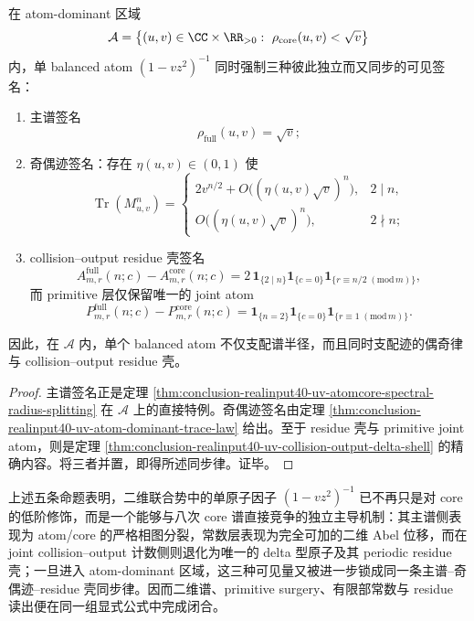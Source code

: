 \begin{theorem}\label{thm:conclusion-realinput40-uv-atom-dominant-three-signature-synchrony}
在 atom-dominant 区域
\[
\mathcal A
=
\bigl\{(u,v)\in\CC\times\RR_{>0}:\ \rho_{\mathrm{core}}(u,v)<\sqrt v\bigr\}
\]
内，单 balanced atom \((1-vz^2)^{-1}\) 同时强制三种彼此独立而又同步的可见签名：
\begin{enumerate}
  \item 主谱签名
  \[
  \rho_{\mathrm{full}}(u,v)=\sqrt v;
  \]
  \item 奇偶迹签名：存在 \(\eta(u,v)\in(0,1)\) 使
  \[
  \operatorname{Tr}(M_{u,v}^n)=
  \begin{cases}
  2v^{n/2}+O\!\bigl((\eta(u,v)\sqrt v)^n\bigr),& 2\mid n,\\[4pt]
  O\!\bigl((\eta(u,v)\sqrt v)^n\bigr),& 2\nmid n;
  \end{cases}
  \]
  \item collision--output residue 壳签名
  \[
  A_{m,r}^{\mathrm{full}}(n;c)-A_{m,r}^{\mathrm{core}}(n;c)
  =
  2\,\mathbf 1_{\{2\mid n\}}
  \mathbf 1_{\{c=0\}}
  \mathbf 1_{\{r\equiv n/2\;(\mathrm{mod}\,m)\}},
  \]
  而 primitive 层仅保留唯一的 joint atom
  \[
  P_{m,r}^{\mathrm{full}}(n;c)-P_{m,r}^{\mathrm{core}}(n;c)
  =
  \mathbf 1_{\{n=2\}}
  \mathbf 1_{\{c=0\}}
  \mathbf 1_{\{r\equiv 1\;(\mathrm{mod}\,m)\}}.
  \]
\end{enumerate}
因此，在 \(\mathcal A\) 内，单个 balanced atom 不仅支配谱半径，而且同时支配迹的偶奇律与 collision--output residue 壳。
\end{theorem}
\begin{proof}
主谱签名正是定理 \ref{thm:conclusion-realinput40-uv-atomcore-spectral-radius-splitting} 在 \(\mathcal A\) 上的直接特例。奇偶迹签名由定理 \ref{thm:conclusion-realinput40-uv-atom-dominant-trace-law} 给出。至于 residue 壳与 primitive joint atom，则是定理 \ref{thm:conclusion-realinput40-uv-collision-output-delta-shell} 的精确内容。将三者并置，即得所述同步律。证毕。
\end{proof}

上述五条命题表明，二维联合势中的单原子因子 \((1-vz^2)^{-1}\) 已不再只是对 core 的低阶修饰，而是一个能够与八次 core 谱直接竞争的独立主导机制：其主谱侧表现为 atom/core 的严格相图分裂，常数层表现为完全可加的二维 Abel 位移，而在 joint collision--output 计数侧则退化为唯一的 delta 型原子及其 periodic residue 壳；一旦进入 atom-dominant 区域，这三种可见量又被进一步锁成同一条主谱--奇偶迹--residue 壳同步律。因而二维谱、primitive surgery、有限部常数与 residue 读出便在同一组显式公式中完成闭合。

